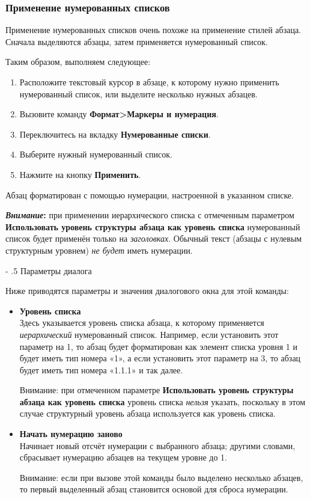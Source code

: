 ﻿\documentclass[a4paper,10pt]{article}
\makeatletter
\renewcommand\paragraph{%
   \@startsection{paragraph}{4}{0mm}%
      {-\baselineskip}%
      {.5\baselineskip}%
      {\normalfont\normalsize\bfseries}}
\makeatother
\begin{document}
\subsubsection{Применение нумерованных списков} \label{sec:применениенумеровсписков}
Применение нумерованных списков очень похоже на применение стилей абзаца. Сначала выделяются абзацы, затем применяется нумерованный список.

Таким образом, выполняем следующее:
\begin{enumerate}
 \item Расположите текстовый курсор в абзаце, к которому нужно применить нумерованный список, или выделите несколько нужных абзацев.
 \item Вызовите команду \textbf{Формат>Маркеры и нумерация}.
 \item Переключитесь на вкладку \textbf{Нумерованные списки}.
 \item Выберите нужный нумерованный список.
 \item Нажмите на кнопку \textbf{Применить}.
\end{enumerate}

Абзац форматирован с помощью нумерации, настроенной в указанном списке.

\begin{mdframed}[backgroundcolor=blue!10]
\textbf{\textit{Внимание}:} при применении иерархического списка с отмеченным параметром \textbf{Использовать уровень структуры абзаца как уровень списка} нумерованный список будет применён только на \textit{заголовках}. Обычный текст (абзацы с нулевым структурным уровнем) \textit{не будет} иметь нумерации.
\end{mdframed}

\paragraph{Параметры диалога}

Ниже приводятся параметры и значения диалогового окна для этой команды:
\begin{itemize}
 \item \textbf{Уровень списка}\\
 Здесь указывается уровень списка абзаца, к которому применяется \textit{иерархический} нумерованный список. Например, если установить этот параметр на 1, то абзац будет форматирован как элемент списка уровня 1 и будет иметь тип номера «1», а если установить этот параметр на 3, то абзац будет иметь тип номера «1.1.1» и так далее.
 
 Внимание: при отмеченном параметре \textbf{Использовать уровень структуры абзаца как уровень списка} уровень списка \textit{нельзя} указать, поскольку в этом случае структурный уровень абзаца используется как уровень списка.
 \item \textbf{Начать нумерацию заново}\\
 Начинает новый отсчёт нумерации с выбранного абзаца; другими словами, сбрасывает нумерацию абзацев на текущем уровне до 1.
 
 Внимание: если при вызове этой команды было выделено несколько абзацев, то первый выделенный абзац становится основой для сброса нумерации.
\end{itemize}
\end{document}

